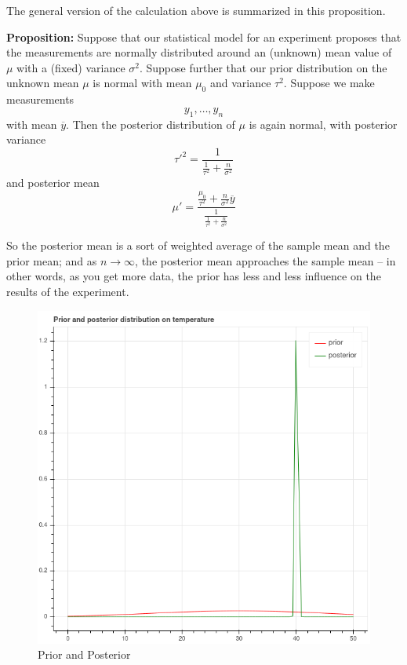 \documentclass[
  11pt,
  letterpaper,
]{scrbook}
\theoremstyle{plain}
\theoremstyle{plain}
\theoremstyle{remark}
\begin{document}
The general version of the calculation above is summarized in this
proposition.

\textbf{Proposition:} Suppose that our statistical model for an
experiment proposes that the measurements are normally distributed
around an (unknown) mean value of \(\mu\) with a (fixed) variance
\(\sigma^2\). Suppose further that our prior distribution on the unknown
mean \(\mu\) is normal with mean \(\mu_0\) and variance \(\tau^2\).
Suppose we make measurements \[
y_1,\ldots, y_n
\] with mean \(\overline{y}\). Then the posterior distribution of
\(\mu\) is again normal, with posterior variance \[
\tau'^2 = \frac{1}{\frac{1}{\tau^2}+\frac{n}{\sigma^2}}
\] and posterior mean \[
\mu' = \frac{\frac{\mu_0}{\tau^2}+\frac{n}{\sigma^2}\overline{y}}{\frac{1}{\frac{1}{\tau^2}+\frac{n}{\sigma^2}}}
\]

So the posterior mean is a sort of weighted average of the sample mean
and the prior mean; and as \(n\to\infty\), the posterior mean approaches
the sample mean -- in other words, as you get more data, the prior has
less and less influence on the results of the experiment.

\begin{figure}

{\centering \includegraphics{chapters/img/priorposterior.png}

}

\caption{\label{fig-comparison}Prior and Posterior}

\end{figure}
\end{document}
